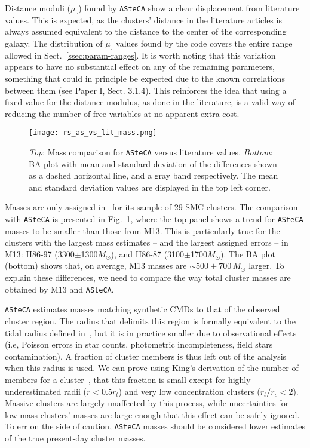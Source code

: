 \documentclass{aa}
\begin{document}
Distance moduli ($\mu_{\circ}$) found by \texttt{ASteCA} show a clear
displacement from literature values. This is expected, as the clusters' distance
in the literature articles is always assumed equivalent to the
distance to the center of the corresponding galaxy.
The distribution of $\mu_{\circ}$ values found by the code covers the entire
range allowed in Sect.~\ref{ssec:param-ranges}.
%
It is worth noting that this variation appears to have no substantial effect on
any of the remaining parameters, something that could in principle be expected
due to the known correlations between them (see Paper I, Sect. 3.1.4).
This reinforces the idea that using a fixed value for the distance modulus, as
done in the literature, is a valid way of reducing the number of free variables
at no apparent extra cost.\\

\begin{figure}
\centering
\texttt{[image: rs\_as\_vs\_lit\_mass.png]}
\caption{\emph{Top}: Mass comparison for \texttt{ASteCA} versus literature
values.
\emph{Bottom}: BA plot with mean and standard deviation of the differences
shown as a dashed horizontal line, and a gray band respectively. The mean and
standard deviation values are displayed in the top left corner.}
\label{fig:as_vs_lit_mass}
\end{figure}

Masses are only assigned in~\citet[][M13]{Maia_2013} for its sample of 29
SMC clusters. The comparison with \texttt{ASteCA} is presented in
Fig.~\ref{fig:as_vs_lit_mass}, where the top panel shows a trend for
\texttt{ASteCA} masses to be smaller than those from M13. This is particularly
true for the clusters with the largest mass estimates -- and the largest
assigned errors -- in M13: H86-97 (3300$\pm$1300$M_{\odot}$), and H86-87
(3100$\pm$1700$M_{\odot}$). The BA plot (bottom) shows that, on average, M13
masses are ${\sim}500{\pm}700\,M_{\odot}$ larger.
%
To explain these differences, we need to compare the way total cluster masses
are obtained by M13 and \texttt{ASteCA}.

\texttt{ASteCA} estimates masses matching synthetic CMDs to that of
the observed cluster region.
The radius that delimits this region is formally equivalent to the
tidal radius defined in~\cite[][see Sect.~\ref{ssec:centre-radius}]{King_1962},
but it is in practice smaller due to observational effects (i.e, Poisson
errors in star counts, photometric incompleteness, field stars contamination).
%
A fraction of cluster members is thus left out of the analysis when this radius
is used. We can prove using King's derivation of the number of
members for a cluster~\citep[Eq. 18,][]{King_1962}, that this fraction is small
except for highly underestimated radii ($r{<}0.5r_t$) and very low concentration
clusters ($r_t/r_c{<}2$).
%
Massive clusters are largely unaffected by this process, while uncertainties for
low-mass clusters' masses are large enough that this effect can be safely
ignored. To err on the side of caution, \texttt{ASteCA} masses should be
considered lower estimates of the true present-day cluster masses.
\end{document}
